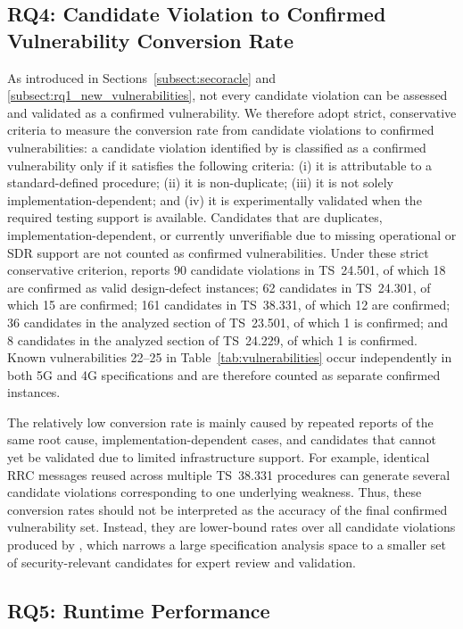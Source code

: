 \subsection{RQ4: Candidate Violation to Confirmed Vulnerability Conversion Rate}

As introduced in Sections~\ref{subsect:secoracle} and \ref{subsect:rq1_new_vulnerabilities}, not every candidate violation can be assessed and validated as a confirmed vulnerability. We therefore adopt strict, conservative criteria to measure the conversion rate from candidate violations to confirmed vulnerabilities: a candidate violation identified by \lm is classified as a confirmed vulnerability only if it satisfies the following criteria: (i) it is attributable to a standard-defined procedure; (ii) it is non-duplicate; (iii) it is not solely implementation-dependent; and (iv) it is experimentally validated when the required testing support is available. Candidates that are duplicates, implementation-dependent, or currently unverifiable due to missing operational or SDR support are not counted as confirmed vulnerabilities. 
Under these strict conservative criterion, \lm reports 90 candidate violations in TS~24.501, of which 18 are confirmed as valid design-defect instances; 62 candidates in TS~24.301, of which 15 are confirmed; 161 candidates in TS~38.331, of which 12 are confirmed; 36 candidates in the analyzed section of TS~23.501, of which 1 is confirmed; and 8 candidates in the analyzed section of TS~24.229, of which 1 is confirmed. Known vulnerabilities 22--25 in Table~\ref{tab:vulnerabilities} occur independently in both 5G and 4G specifications and are therefore counted as separate confirmed instances. 


The relatively low conversion rate is mainly caused by repeated reports of the same root cause, implementation-dependent cases, and candidates that cannot yet be validated due to limited infrastructure support. For example, identical RRC messages reused across multiple TS~38.331 procedures can generate several candidate violations corresponding to one underlying weakness. Thus, these conversion rates should not be interpreted as the accuracy of the final confirmed vulnerability set. 
Instead, they are lower-bound rates over all candidate violations produced by \lm, which narrows a large specification analysis space to a smaller set of security-relevant candidates for expert review and validation. 





\subsection{RQ5: Runtime Performance}

